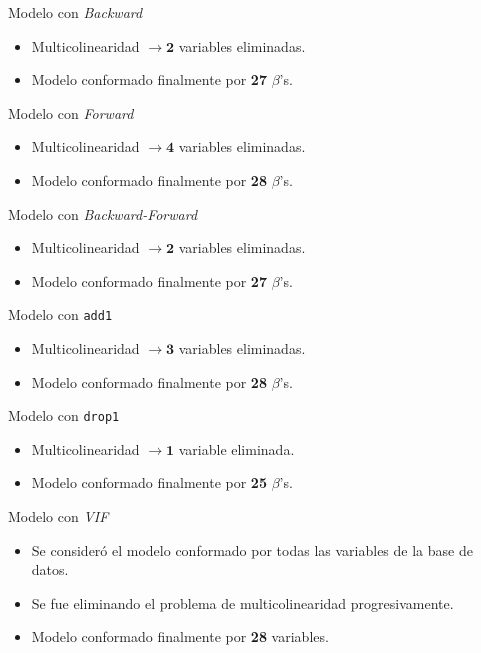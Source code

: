\documentclass[11pt]{beamer}
\newcommand{\B}{\beta}
\newcommand{\cod}[1]{\texttt{\frenchspacing#1}}
\begin{document}
\begin{frame}{Modelo con \textit{Backward}}
	\begin{itemize}
		\item Multicolinearidad $\to \mathbf{2}$ variables eliminadas.
		\pause
		\item Modelo conformado finalmente por \textbf{27} $\B$'s.
	\end{itemize}
\end{frame}

\begin{frame}{Modelo con \textit{Forward}}
	\begin{itemize}
		\item Multicolinearidad $\to \mathbf{4}$ variables eliminadas.
		\pause
		\item Modelo conformado finalmente por \textbf{28} $\B$'s.
	\end{itemize}
\end{frame}

\begin{frame}{Modelo con \textit{Backward-Forward}}
	\begin{itemize}
		\item Multicolinearidad $\to \mathbf{2}$ variables eliminadas.
		\pause
		\item Modelo conformado finalmente por \textbf{27} $\B$'s.
	\end{itemize}
\end{frame}

\begin{frame}{Modelo con \cod{add1}}
	\begin{itemize}
		\item Multicolinearidad $\to \mathbf{3}$ variables eliminadas.
		\pause
		\item Modelo conformado finalmente por \textbf{28} $\B$'s.
	\end{itemize}
\end{frame}

\begin{frame}{Modelo con \cod{drop1}}
	\begin{itemize}
		\item Multicolinearidad $\to \mathbf{1}$ variable eliminada.
		\pause
		\item Modelo conformado finalmente por \textbf{25} $\B$'s.
	\end{itemize}
\end{frame}

\begin{frame}{Modelo con \textit{VIF}}
	\begin{itemize}
		\item Se consideró el modelo conformado por todas las variables de la base de datos.
		\pause
		\item Se fue eliminando el problema de multicolinearidad progresivamente.
		\pause
		\item Modelo conformado finalmente por \textbf{28} variables.
	\end{itemize}
\end{frame}
\end{document}
